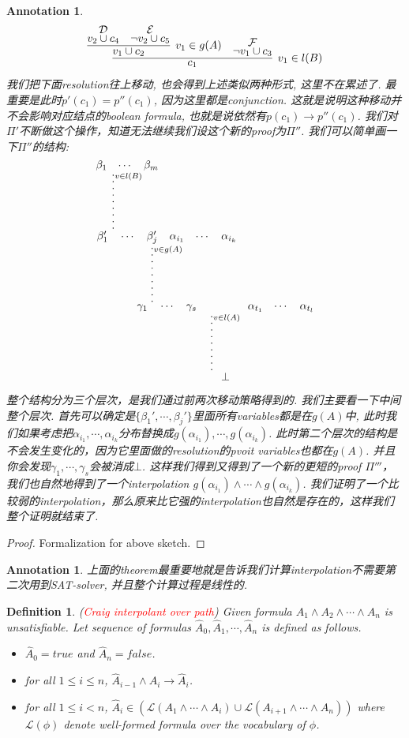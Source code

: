 \documentclass{article}
\newtheorem{definition}[theorem]{Definition}
\newtheorem{annotation}[theorem]{Annotation}
\newcommand{\redt}[1]{\textcolor{red}{#1}}
\begin{document}
\begin{annotation}
\[
	\infer[v_1 \in l(B)]{c_1}{\infer[v_1 \in g(A)]{v_1 \cup c_2}{\deduce{v_2 \cup c_4}{\mathcal{D}} & \deduce{\neg v_2 \cup c_5}{\mathcal{E}}} & \deduce{\neg v_1 \cup c_3}{\mathcal{F}}}
\]
我们把下面resolution往上移动, 也会得到上述类似两种形式, 这里不在累述了. 最重要是此时$p'(c_1) = p''(c_1)$, 因为这里都是conjunction. 这就是说明这种移动并不会影响对应结点的boolean formula, 也就是说依然有$p(c_1)\to p''(c_1)$. 我们对$\varPi'$不断做这个操作，知道无法继续我们设这个新的proof为$\varPi''$. 我们可以简单画一下$\varPi''$的结构:
\[
	\deduce[\lvdots^{v \in l(A)}]{\bot}{\deduce[\lvdots^{v \in g(A)}]{\gamma_1 \quad \cdots \quad \gamma_s}{\deduce[\lvdots^{v \in l(B)}]{\beta_1' \quad \cdots \quad \beta_j'}{\beta_1 & \cdots & \beta_m} & \alpha_{i_1} & \cdots & \alpha_{i_k}} & \alpha_{t_1} & \cdots & \alpha_{t_l}}
\]
整个结构分为三个层次，是我们通过前两次移动策略得到的. 我们主要看一下中间整个层次. 首先可以确定是$\{\beta_1',\cdots, \beta_j'\}$里面所有variables都是在$g(A)$中, 此时我们如果考虑把$\alpha_{i_1}, \cdots , \alpha_{i_k}$分布替换成$g(\alpha_{i_1}), \cdots,  g(\alpha_{i_k})$. 此时第二个层次的结构是不会发生变化的，因为它里面做的resolution的pvoit variables也都在$g(A)$. 并且你会发现${\gamma_1, \cdots, \gamma_s}$会被消成$\bot$. 这样我们得到又得到了一个新的更短的proof $\varPi'''$，我们也自然地得到了一个interpolation $g(\alpha_{i_1}) \wedge \cdots \wedge g(\alpha_{i_k})$. 我们证明了一个比较弱的interpolation，那么原来比它强的interpolation也自然是存在的，这样我们整个证明就结束了.
\end{annotation}

\begin{proof}
\rm Formalization for above sketch.
\end{proof}

\begin{annotation}
\rm 上面的theorem最重要地就是告诉我们计算interpolation不需要第二次用到SAT-solver, 并且整个计算过程是线性的. 
\end{annotation}

\begin{definition}
\rm (\redt{Craig interpolant over path}) Given formula $A_1 \wedge A_2 \wedge \cdots \wedge A_n$ is unsatisfiable. Let sequence of formulas $\hat{A}_0, \hat{A}_1, \cdots, \hat{A}_n$ is defined as follows.
\begin{itemize}
	\item $\hat{A}_0 = true$ and $\hat{A}_n = false$. 
	\item for all $1 \leq i \leq n$, $\hat{A}_{i-1} \wedge A_i \to \hat{A}_{i}$.
	\item for all $1 \leq i < n$, $\hat{A}_i \in (\mathcal{L}(A_1 \wedge \cdots \wedge A_i) \cup \mathcal{L}(A_{i+1} \wedge \cdots \wedge A_n))$ where $\mathcal{L}(\phi)$ denote well-formed formula over the vocabulary of $\phi$.
\end{itemize}
\end{definition}
\end{document}
